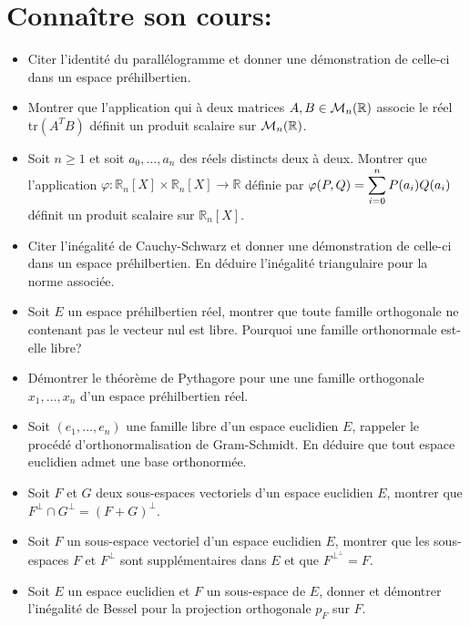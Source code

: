 \documentclass[a4paper,11pt]{article}
\theoremstyle{definition}
\begin{document}
 
 
 

\noindent{}

\smallskip
\section*{Connaître son cours:}
\begin{itemize}[$\bullet$]
	\item Citer l'identité du parallélogramme et donner une démonstration de celle-ci dans un espace préhilbertien. 
	\item Montrer que l’application qui à deux matrices $A,B \in \mathcal{M}_n (\mathbb{R})$ associe le réel tr$(A^T B )$ définit un produit scalaire sur $\mathcal{M}_n (\mathbb{R})$.
	\item Soit $n\geq 1$ et soit $a_0,\dots,a_n$ des réels distincts deux à deux. Montrer que l'application $\varphi:\mathbb R_n[X]\times\mathbb R_n[X]\to\mathbb R$
	définie par $\displaystyle \varphi(P,Q)=\sum_{i=0}^n P(a_i)Q(a_i)$ définit un produit scalaire sur $\mathbb R_n[X]$.
	\item  Citer l'inégalité de Cauchy-Schwarz et donner une démonstration de celle-ci dans un espace préhilbertien. En déduire l'inégalité triangulaire pour la norme associée.
	\item Soit $E$ un espace préhilbertien réel, montrer que toute famille orthogonale ne contenant pas le vecteur nul est libre. Pourquoi une famille orthonormale est-elle libre? 
	\item Démontrer le théorème de Pythagore pour une une famille orthogonale $x_1 ,\dots , x_n$ d’un espace préhilbertien réel.
	\item Soit $(e_1 , \dots , e_n )$ une famille libre d’un espace euclidien $E$, rappeler le procédé d’orthonormalisation de Gram-Schmidt. En déduire que tout espace euclidien admet une base orthonormée.
	\item Soit $F$ et $G$ deux sous-espaces vectoriels d’un espace euclidien $E$, montrer que $F^\perp  \cap G^\perp = (F + G)^\perp$.
	\item Soit $F$ un sous-espace vectoriel d’un espace euclidien $E$, montrer que les sous-espaces $F$ et $F^\perp$ sont supplémentaires dans $E$ et que $F^{\perp^\perp} = F$.
	\item Soit $E$ un espace euclidien et $F$ un sous-espace de $E$, donner et démontrer l'inégalité de Bessel pour la projection orthogonale $p_F$ sur $F$. 

\end{itemize}
\raggedright
\end{document}
